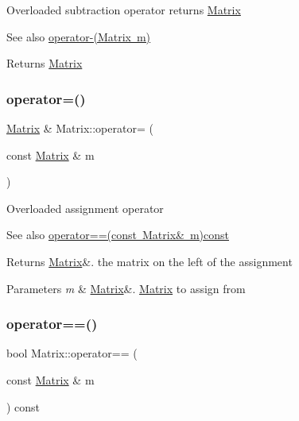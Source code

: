 Overloaded subtraction operator returns \mbox{\hyperlink{class_matrix}{Matrix}} \begin{DoxySeeAlso}{See also}
\mbox{\hyperlink{class_matrix_a2aabf841a4302d528f8b102c0800a263}{operator-\/(\+Matrix m)}} 
\end{DoxySeeAlso}
\begin{DoxyReturn}{Returns}
\mbox{\hyperlink{class_matrix}{Matrix}} 
\end{DoxyReturn}
\mbox{\label{class_matrix_aea5a06385f646eb4a63929fae6fa3e14}} 
\subsubsection{\texorpdfstring{operator=()}{operator=()}}
{\footnotesize\ttfamily \mbox{\hyperlink{class_matrix}{Matrix}} \& Matrix\+::operator= (\begin{DoxyParamCaption}\item[{const \mbox{\hyperlink{class_matrix}{Matrix}} \&}]{m }\end{DoxyParamCaption})}

Overloaded assignment operator \begin{DoxySeeAlso}{See also}
\mbox{\hyperlink{class_matrix_a35097c20bcb1495b57d452db0d7b1f53}{operator==(const Matrix\& m)const}} 
\end{DoxySeeAlso}
\begin{DoxyReturn}{Returns}
\mbox{\hyperlink{class_matrix}{Matrix}}\&. the matrix on the left of the assignment 
\end{DoxyReturn}

\begin{DoxyParams}{Parameters}
{\em m} & \mbox{\hyperlink{class_matrix}{Matrix}}\&. \mbox{\hyperlink{class_matrix}{Matrix}} to assign from \\
\hline
\end{DoxyParams}
\mbox{\label{class_matrix_a35097c20bcb1495b57d452db0d7b1f53}} 
\subsubsection{\texorpdfstring{operator==()}{operator==()}}
{\footnotesize\ttfamily bool Matrix\+::operator== (\begin{DoxyParamCaption}\item[{const \mbox{\hyperlink{class_matrix}{Matrix}} \&}]{m }\end{DoxyParamCaption}) const}

